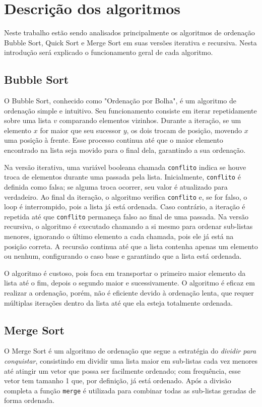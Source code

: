 \section*{Descrição dos algoritmos}
Neste trabalho estão sendo analisados principalmente os algoritmos de ordenação Bubble Sort, Quick Sort e Merge Sort em suas versões iterativa e recursiva. Nesta introdução será explicado o funcionamento geral de cada algoritmo.
\subsection*{Bubble Sort}
O Bubble Sort, conhecido como "Ordenação por Bolha", é um algoritmo de ordenação simple e intuitivo. Seu funcionamento consiste em iterar repetidamente sobre uma lista $v$ comparando elementos vizinhos. Durante a iteração, se um elemento $x$ for maior que seu sucessor $y$, os dois trocam de posição, movendo $x$ uma posição à frente. Esse processo continua até que o maior elemento encontrado na lista seja movido para o final dela, garantindo a sua ordenação.

Na versão iterativa, uma variável booleana chamada \texttt{conflito} indica se houve troca de elementos durante uma passada pela lista. Inicialmente, \texttt{conflito} é definida como falsa; se alguma troca ocorrer, seu valor é atualizado para verdadeiro. Ao final da iteração, o algoritmo verifica \texttt{conflito} e, se for falso, o loop é interrompido, pois a lista já está ordenada. Caso contrário, a iteração é repetida até que \texttt{conflito} permaneça falso ao final de uma passada. Na versão recursiva, o algoritmo é executado chamando a si mesmo para ordenar sub-listas menores, ignorando o último elemento a cada chamada, pois ele já está na posição correta. A recursão continua até que a lista contenha apenas um elemento ou nenhum, configurando o caso base e garantindo que a lista está ordenada.

O algoritmo é custoso, pois foca em transportar o primeiro maior elemento da lista até o fim, depois o segundo maior e sucessivamente. O algoritmo é eficaz em realizar a ordenação, porém, não é eficiente devido à ordenação lenta, que requer múltiplas iterações dentro da lista até que ela esteja totalmente ordenada. 

\subsection*{Merge Sort}
O Merge Sort é um algoritmo de ordenação que segue a estratégia do \textit{dividir para conquistar}, consistindo em dividir uma lista maior em sub-listas cada vez menores até atingir um vetor que possa ser facilmente ordenado; com frequência, esse vetor tem tamanho 1 que, por definição, já está ordenado. Após a divisão completa a função \texttt{merge} é utilizada para combinar todas as sub-listas geradas de forma ordenada. 

